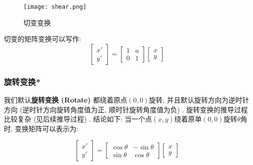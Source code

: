 \documentclass[openany]{progbookcn}
\begin{document}
\begin{figure}[H]
	\centering
	\texttt{[image: shear.png]}
	\caption{切变变换}
	\label{fig:shear}
\end{figure}

切变的矩阵变换可以写作: 
\begin{equation}
	\begin{bmatrix}x'\\y'\end{bmatrix}=\begin{bmatrix}1&a\\0&1\end{bmatrix}\begin{bmatrix}x\\y\end{bmatrix}
\end{equation}

\subsubsection{旋转变换*}

我们默认\textbf{旋转变换 (Rotate) }都绕着原点$(0,0)$旋转, 并且默认旋转方向为逆时针方向 (逆时针方向旋转角度值为正, 顺时针旋转角度值为负) . 旋转变换的推导过程比较复杂 (见后续推导过程) . 结论如下: 当一个点$(x,y)$绕着原单$(0,0)$旋转$\theta$角时, 变换矩阵可以表示为: 

\begin{equation}
	\begin{bmatrix}x'\\y'\end{bmatrix}=\begin{bmatrix}\cos\theta&-\sin\theta\\\sin\theta&\cos\theta\end{bmatrix}\begin{bmatrix}x\\y\end{bmatrix}
\end{equation}
\end{document}
